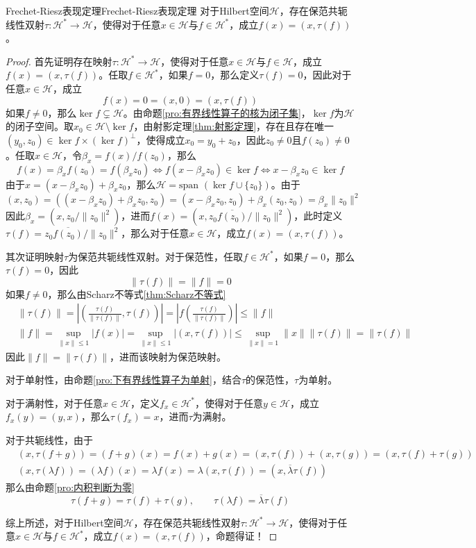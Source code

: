 \documentclass[lang = cn, scheme = chinese, thmcnt = section]{elegantbook}
\begin{document}
\begin{theorem}{Frechet-Riesz表现定理}{Frechet-Riesz表现定理}
	对于Hilbert空间$\mathcal{H}$，存在保范共轭线性双射$\tau:\mathcal{H}^*\to \mathcal{H}$，使得对于任意$x\in \mathcal{H}$与$f\in \mathcal{H}^*$，成立$f(x)=(x,\tau(f))$。
\end{theorem}

\begin{proof}
	首先证明存在映射$\tau:\mathcal{H}^*\to \mathcal{H}$，使得对于任意$x\in \mathcal{H}$与$f\in \mathcal{H}$，成立$f(x)=(x,\tau(f))$。任取$f\in \mathcal{H}^*$，如果$f=0$，那么定义$\tau(f)=0$，因此对于任意$x\in \mathcal{H}$，成立
	$$
	f(x)=0=(x,0)=(x,\tau(f))
	$$
	如果$f\ne 0$，那么$\ker f\subsetneq \mathcal{H}$。由命题\ref{pro:有界线性算子的核为闭子集}，$\ker f$为$\mathcal{H}$的闭子空间。取$x_0\in \mathcal{H}\setminus\ker f$，由射影定理\ref{thm:射影定理}，存在且存在唯一$(y_0,z_0)\in\ker f\times(\ker f)^\perp$，使得成立$x_0=y_0+z_0$，因此$z_0\ne0$且$f(z_0)\ne0$。任取$x\in\mathcal{H}$，令$\beta_x=f(x)/f(z_0)$，那么
	$$
	f(x)=\beta_xf(z_0)=f(\beta_x z_0)\iff f(x-\beta_xz_0)\in\ker f\iff x-\beta_xz_0\in\ker f
	$$
	由于$x=(x-\beta_xz_0)+\beta_xz_0$，那么$\mathcal{H}=\text{span }(\ker f\cup\{z_0\})$。由于
	$$
	(x,z_0)=((x-\beta_xz_0)+\beta_xz_0,z_0)=(x-\beta_xz_0,z_0)+\beta_x(z_0,z_0)
	=\beta_x\|z_0\|^2
	$$
	因此$\beta_x=(x,z_0/\|z_0\|^2)$，进而$f(x)=(x,z_0\overline{f(z_0)}/\|z_0\|^2)$，此时定义$\tau(f)=z_0\overline{f(z_0)}/\|z_0\|^2$，那么对于任意$x\in \mathcal{H}$，成立$f(x)=(x,\tau(f))$。
	
	其次证明映射$\tau$为保范共轭线性双射。对于保范性，任取$f\in\mathcal{H}^*$，如果$f=0$，那么$\tau(f)=0$，因此
	$$
	\|\tau(f)\|=\|f\|=0
	$$
	如果$f\ne 0$，那么由Scharz不等式\ref{thm:Scharz不等式}
	$$
	\begin{align*}
		&\| \tau(f)\|
		=\left|\left(\frac{\tau(f)}{\|\tau(f)\|},\tau(f)\right)\right|
		=\left|f\left(\frac{\tau(f)}{\|\tau(f)\|}\right)\right|
		\le \|f\|\\
		&\|f\|
		=\sup_{\|x\|\le 1}|f(x)|
		=\sup_{\|x\|\le 1}|(x,\tau(f))|
		\le\sup_{\|x\|=1}\|x\|\|\tau(f)\|=\|\tau(f)\|
	\end{align*}
	$$
	因此$\|f\|=\|\tau(f)\|$，进而该映射为保范映射。
	
	对于单射性，由命题\ref{pro:下有界线性算子为单射}，结合$\tau$的保范性，$\tau$为单射。
	
	对于满射性，对于任意$x\in\mathcal{H}$，定义$f_x\in\mathcal{H}^*$，使得对于任意$y\in\mathcal{H}$，成立$f_x(y)=(y,x)$，那么$\tau(f_x)=x$，进而$\tau$为满射。
	
	对于共轭线性，由于
	\begin{align*}
		&(x,\tau(f+g))=(f+g)(x)=f(x)+g(x)=(x,\tau(f))+(x,\tau(g))=(x,\tau(f)+\tau(g))\\
		&(x,\tau(\lambda f))=(\lambda f)(x)=\lambda f(x)=\lambda (x,\tau(f))=(x,\overline{\lambda}\tau(f))
	\end{align*}
	那么由命题\ref{pro:内积判断为零}
	$$
	\tau(f+g)=\tau(f)+\tau(g),\qquad 
	\tau(\lambda f)=\overline{\lambda }\tau(f)
	$$
	
	综上所述，对于Hilbert空间$\mathcal{H}$，存在保范共轭线性双射$\tau:\mathcal{H}^*\to \mathcal{H}$，使得对于任意$x\in \mathcal{H}$与$f\in \mathcal{H}^*$，成立$f(x)=(x,\tau(f))$，命题得证！
\end{proof}
\end{document}
